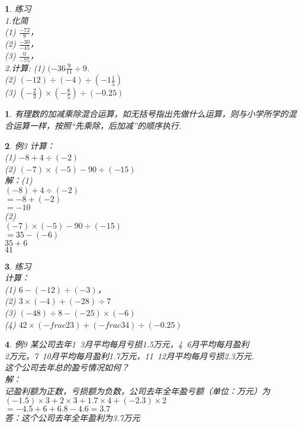 \documentclass[11pt]{article}
\newtheorem{exercise}{ }
\newtheorem{article}{ }
\begin{document}
\begin{exercise}
练习\\
1.化简\\
(1)
$\frac{-72}{9}$，\\
(2)
$\frac{-30}{-45}$，\\
(3)
$\frac{0}{-75}$，\\
2.计算:
(1)
$(-36\frac{9}{11}\div 9$.\\
(2)
$(-12)\div{(-4)}\div(-1\frac{1}{5})$\\
(3)
$(-\frac{2}{3})\times(-\frac{8}{5})\div(-0.25)$\\
\end{exercise}
\begin{article}
	有理数的加减乘除混合运算，如无括号指出先做什么运算，则与小学所学的混合运算一样，按照“先乘除，后加减”的顺序执行.\\
\end{article}
\begin{exercise}
例3 计算：\\
(1)
$-8+4\div(-2)$\\
(2)
$(-7)\times(-5)-90\div(-15)$\\
解：(1)\\
$(-8)+4\div(-2)$\\
$=-8+(-2)$\\
$=-10$\\
(2)\\
$(-7)\times(-5)-90\div(-15)$\\
$=35-(-6)$\\
$35+6$\\
$41$\\
\end{exercise}

\begin{exercise}
练习\\
计算：\\
(1)
$6-(-12)\div(-3)$，\\
(2)
$3\times(-4)+(-28)\div7$\\
(3)
$(-48)\div8-(-25)\times(-6)$\\
(4)
$42\times(-frac{2}{3})+(-frac{3}{4})\div(-0.25)$
\end{exercise}

\begin{exercise}
例9 某公司去年1~3月平均每月亏损1.5万元，4~6月平均每月盈利\\
2万元，7~10月平均每月盈利1.7万元，11~12月平均每月亏损2.3万元.\\
这个公司去年总的盈亏情况如何？\\
解：\\
记盈利额为正数，亏损额为负数，公司去年全年盈亏额（单位：万元）为\\
$(-1.5)\times3+2\times3+1.7\times4+(-2.3)\times2$\\
$=-4.5+6+6.8-4.6=3.7$\\
答：这个公司去年全年盈利为3.7万元\\
\end{exercise}
\end{document}
